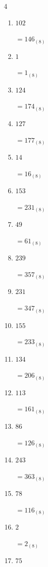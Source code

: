 \begin{multicols}{4}
\begin{enumerate}
  \item $102$

        $=146_{(8)}$

  \item $1$

        $=1_{(8)}$

  \item $124$

        $=174_{(8)}$

  \item $127$

        $=177_{(8)}$

  \item $14$

        $=16_{(8)}$

  \item $153$

        $=231_{(8)}$

  \item $49$

        $=61_{(8)}$

  \item $239$

        $=357_{(8)}$

  \item $231$

        $=347_{(8)}$

  \item $155$

        $=233_{(8)}$

  \item $134$

        $=206_{(8)}$

\columnbreak %

  \item $113$

        $=161_{(8)}$

  \item $86$

        $=126_{(8)}$

  \item $243$

        $=363_{(8)}$

  \item $78$

        $=116_{(8)}$

  \item $2$

        $=2_{(8)}$

  \item $75$


\end{enumerate}
\end{multicols}

